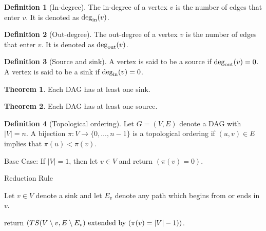 \documentclass[fleqn, a4paper, 12pt, twoside]{article}
\theoremstyle{definition}
\newtheorem{definition}{Definition}
\theoremstyle{theorem}
\newtheorem{theorem}{Theorem}
\begin{document}
\begin{definition}[In-degree]
	The in-degree of a vertex $v$ is the number of edges that enter $v$. It is denoted as $\deg_{\textnormal{in}}(v)$.
\end{definition}

\begin{definition}[Out-degree]
	The out-degree of a vertex $v$ is the number of edges that enter $v$. It is denoted as $\deg_{\textnormal{out}}(v)$.
\end{definition}

\begin{definition}[Source and sink]
	A vertex is said to be a source if $\deg_{\textnormal{out}}(v) = 0$. A vertex is said to be a sink if $\deg_{\textnormal{in}}(v) = 0$.
\end{definition}

\begin{theorem}
	Each DAG has at least one sink.
\end{theorem}

\begin{theorem}
	Each DAG has at least one source.
\end{theorem}

\begin{definition}[Topological ordering]
	Let $G = (V,E)$ denote a DAG with $|V| = n$. A bijection $\pi : V \to \{0, \dots, n - 1\}$ is a topological ordering if $(u,v) \in E$ implies that $\pi(u) < \pi(v)$.
\end{definition}

\begin{algorithm}
	\caption{$\mathrm{TS}(V,E)$ - An algorithm for sorting the vertices of a DAG $G = (V,E)$ in topological ordering.}
	\begin{algorithmic}[1]
		\item Base Case: If $|V| = 1$, then let $v \in V$ and return $(\pi(v) = 0)$.
		\item Reduction Rule
			\begin{algorithmic}[1]
				\item Let $v \in V$ denote a sink and let $E_v$ denote any path which begins from or ends in $v$.
				\item return $(TS(V \setminus {v} , E \setminus E_v) \textnormal{ extended by } (\pi(v) =|V| - 1))$.
			\end{algorithmic}
	\end{algorithmic}
	\label{algorithm:TS(V,E)}
\end{algorithm}
\end{document}
